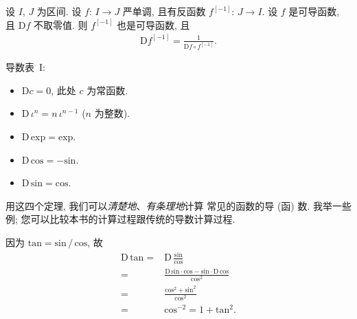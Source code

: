 \begin{theorem}
    设 $I$, $J$ 为区间.
    设 $f$: $I \to J$ 严单调, 且有反函数 $f^{[-1]}$: $J \to I$.
    设 $f$ 是可导函数, 且 $\mathrm{D}f$ 不取零值.
    则 $f^{[-1]}$ 也是可导函数, 且
    \begin{align*}
        \mathrm{D} f^{[-1]} = \frac{1}{\mathrm{D}f \circ f^{[-1]}}.
    \end{align*}
\end{theorem}

\begin{theorem}
    导数表~I:
    \begin{itemize}
        \item $\mathrm{D} c = 0$,
              此处 $c$ 为常函数.
        \item $\mathrm{D}\, \iota^n = n \, \iota^{n - 1}$
              ($n$ 为整数).
        \item $\mathrm{D}\, \mathrm{exp} = \mathrm{exp}$.
        \item $\mathrm{D}\, \mathrm{cos} = -\mathrm{sin}$.
        \item $\mathrm{D}\, \mathrm{sin} = \mathrm{cos}$.
    \end{itemize}
\end{theorem}

用这四个定理,
我们可以\emph{清楚地}、\emph{有条理地}计算%
常见的函数的导 (函) 数.
我举一些例;
您可以比较本书的计算过程跟传统的导数计算过程.

\begin{example}
    因为 $\mathrm{tan} = {\mathrm{sin}}\,/\,{\mathrm{cos}}$,
    故
    \begin{align*}
        \mathrm{D}\, \mathrm{tan}
        = {} & \mathrm{D}\, \frac{\mathrm{sin}}{\mathrm{cos}}                                                                     \\
        = {} & \frac{\mathrm{D}\, \mathrm{sin} \cdot \mathrm{cos} - \mathrm{sin} \cdot \mathrm{D}\, \mathrm{cos}}{\mathrm{cos}^2} \\
        = {} & \frac{\mathrm{cos}^2 + \mathrm{sin}^2}{\mathrm{cos}^2}                                                             \\
        = {} & \mathrm{cos}^{-2} = 1 + \mathrm{tan}^2.
    \end{align*}
\end{example}

